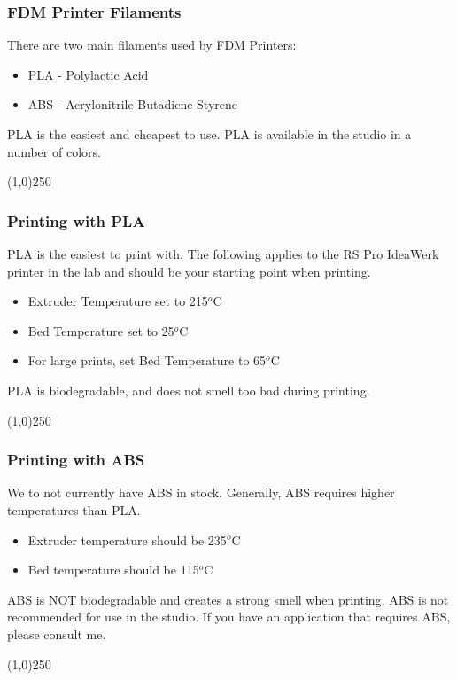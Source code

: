 \begin{frame}
\frametitle{FDM Printer Filaments}
There are two main filaments used by FDM Printers:
\begin{itemize}
	\item PLA - Polylactic Acid
	\item ABS - Acrylonitrile Butadiene Styrene
\end{itemize}
PLA is the easiest and cheapest to use.  PLA is available in the studio in a number of colors. 
\end{frame}
\begin{center}\line(1,0){250}\end{center}

\begin{frame}
\frametitle{Printing with PLA}
PLA is the easiest to print with.  The following applies to the RS Pro IdeaWerk printer in the lab and should be your starting point when printing.
\begin{itemize}
	\item Extruder Temperature set to 215$^o$C
	\item Bed Temperature set to 25$^o$C
	\item For large prints, set Bed Temperature to 65$^o$C
\end{itemize}
PLA is biodegradable, and does not smell too bad during printing.
\end{frame}
\begin{center}\line(1,0){250}\end{center}


\begin{frame}
\frametitle{Printing with ABS}
We to not currently have ABS in stock.  Generally, ABS requires higher temperatures than PLA.
\begin{itemize}
	\item Extruder temperature should be  235$^o$C
	\item Bed temperature should be 115$^o$C
\end{itemize}
ABS is NOT biodegradable and creates a strong smell when printing.  ABS is not recommended for use in the studio.  If you have an application that requires ABS, please consult me.
\end{frame}
\begin{center}\line(1,0){250}\end{center}


